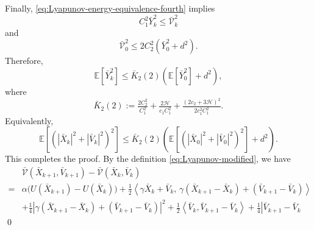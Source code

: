 \documentclass[12pt]{article}
\newenvironment{redtext}
  {\color{black}\ignorespaces}
  {\ignorespacesafterend}
\numberwithin{equation}{section}
\renewenvironment{proof}%
  {\begin{trivlist}%
   \item[]\ignorespaces}%
  {\qed\end{trivlist}}
\renewcommand{\H}{\mathcal{H}}
\begin{document}
\begin{redtext}
\begin{proof}
Finally, \eqref{eq:Lyapunov-energy-equivalence-fourth} implies
\[
C_1^2\bar Y_k^2
\leq
\bar{\mathcal V}_k^2
\]
and
\[
\bar{\mathcal V}_0^2
\leq
2C_2^2
\left(
\bar Y_0^2+d^2
\right).
\]
Therefore,
\[
\mathbb E
\left[
\bar Y_k^2
\right]
\leq
\bar K_2(2)
\left(
\mathbb E[\bar Y_0^2]+d^2
\right),
\]
where
\begin{equation}
\label{eq:K2-fourth-moment}
\bar K_2(2)
:=
\tfrac{2C_2^2}{C_1^2}
+
\tfrac{2\H}{c_1C_1^2}
+
\tfrac{\left(
2c_2+3\H
\right)^2}{2c_1^2C_1^2}.
\end{equation}
Equivalently,
\[
\mathbb E
\left[
\left(
|\bar X_k|^2+|\bar V_k|^2
\right)^2
\right]
\leq
\bar K_2(2)
\left(
\mathbb E
\left[
\left(
|\bar X_0|^2+|\bar V_0|^2
\right)^2
\right]
+d^2
\right).
\]
This completes the proof.
%
\iffalse
By the definition \eqref{eq:Lyapunov-modified}, we have
\begin{align}
&\bar{\mathcal V}(\bar X_{k+1},\bar V_{k+1})
-
\bar{\mathcal V}(\bar X_k,\bar V_k)
\nonumber\\
=&
\alpha
\big(
U(\bar X_{k+1})-U(\bar X_k)
\big)
+
\tfrac12
\left\langle
\gamma\bar X_k+\bar V_k,\,
\gamma(\bar X_{k+1}-\bar X_k)
+
(\bar V_{k+1}-\bar V_k)
\right\rangle
\nonumber\\
&+
\tfrac14
\left|
\gamma(\bar X_{k+1}-\bar X_k)
+
(\bar V_{k+1}-\bar V_k)
\right|^2
+
\tfrac12
\left\langle
\bar V_k,\bar V_{k+1}-\bar V_k
\right\rangle
+
\tfrac14
\left|
\bar V_{k+1}-\bar V_k

\end{align}
\end{proof}
\end{redtext}
\end{document}
